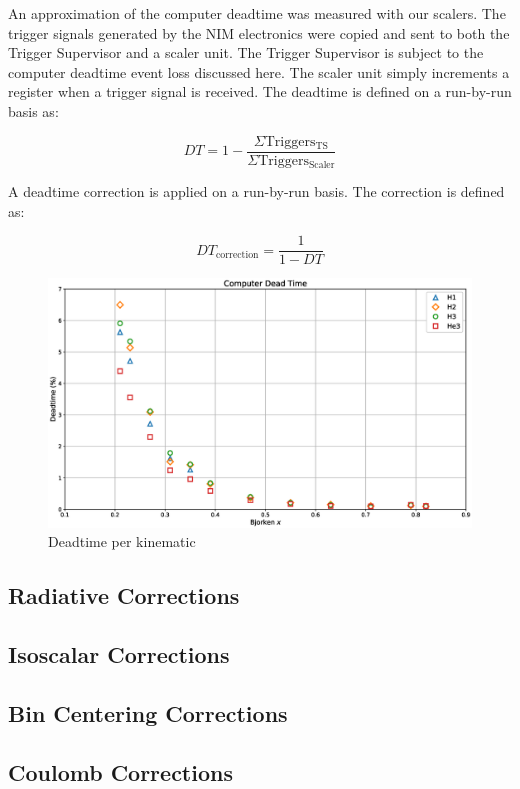 An approximation of the computer deadtime was measured with our scalers. The trigger signals generated by the NIM electronics were copied and sent to both the Trigger Supervisor and a scaler unit. The Trigger Supervisor is subject to the computer deadtime event loss discussed here. The scaler unit simply increments a register when a trigger signal is received. The deadtime is defined on a run-by-run basis as:

\begin{equation}
DT = 1 - \frac{\Sigma \mathrm{Triggers_{TS}}}{\Sigma \mathrm{Triggers_{Scaler}}}
\end{equation}

A deadtime correction is applied on a run-by-run basis. The correction is defined as:

\begin{equation}
DT_{\mathrm{correction}} = \frac{1}{1-DT}
\end{equation}

\begin{figure}
	\includegraphics[width=\textwidth]{./analysis/fig/deadtime.eps}
	\caption{Deadtime per kinematic}
	\label{fig:deadtime}
\end{figure}

\subsection{Radiative Corrections}

\subsection{Isoscalar Corrections}

\subsection{Bin Centering Corrections}

\subsection{Coulomb Corrections}